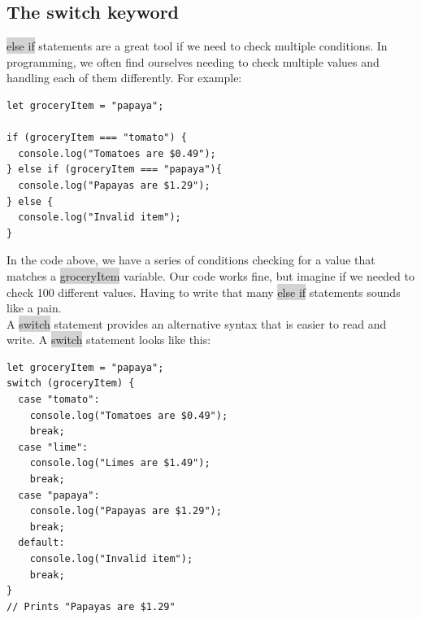 \documentclass[11pt]{article}
\begin{document}
\subsection{The switch keyword}
\colorbox{lightgray}{else if} statements are a great tool if we need to check multiple conditions. In programming, we often find ourselves needing to check multiple values and handling each of them differently. For example:
\begin{lstlisting}
let groceryItem = "papaya";

if (groceryItem === "tomato") {
  console.log("Tomatoes are $0.49");
} else if (groceryItem === "papaya"){
  console.log("Papayas are $1.29");
} else {
  console.log("Invalid item");
}
\end{lstlisting}
In the code above, we have a series of conditions checking for a value that matches a \colorbox{lightgray}{groceryItem} variable. Our code works fine, but imagine if we needed to check 100 different values. Having to write that many \colorbox{lightgray}{else if} statements sounds like a pain. \\
\newline
A \colorbox{lightgray}{switch} statement provides an alternative syntax that is easier to read and write. A \colorbox{lightgray}{switch} statement looks like this:
\begin{lstlisting}
let groceryItem = "papaya";
switch (groceryItem) {
  case "tomato":
    console.log("Tomatoes are $0.49");
    break;
  case "lime":
    console.log("Limes are $1.49");
    break;
  case "papaya":
    console.log("Papayas are $1.29");
    break;
  default:
    console.log("Invalid item");
    break;
}
// Prints "Papayas are $1.29"
\end{lstlisting}
\end{document}

